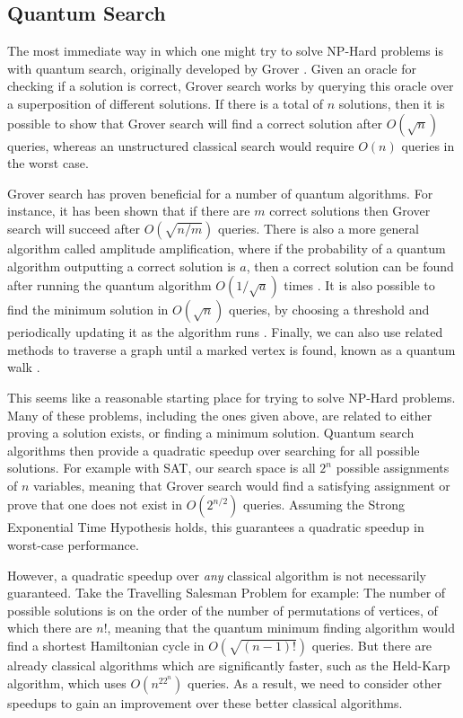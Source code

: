 \subsection{Quantum Search}

The most immediate way in which one might try to solve NP-Hard problems is with quantum search, originally developed by Grover \cite{grover96}. Given an oracle for checking if a solution is correct, Grover search works by querying this oracle over a superposition of different solutions. If there is a total of $n$ solutions, then it is possible to show that Grover search will find a correct solution after $O(\sqrt{n})$ queries, whereas an unstructured classical search would require $O(n)$ queries in the worst case.

Grover search has proven beneficial for a number of quantum algorithms. For instance, it has been shown that if there are $m$ correct solutions then Grover search will succeed after $O(\sqrt{n/m})$ queries. There is also a more general algorithm called amplitude amplification, where if the probability of a quantum algorithm outputting a correct solution is $a$, then a correct solution can be found after running the quantum algorithm $O(1/\sqrt{a})$ times \cite{brassard2002}. It is also possible to find the minimum solution in $O(\sqrt{n})$ queries, by choosing a threshold and periodically updating it as the algorithm runs \cite{durr1996}. Finally, we can also use related methods to traverse a graph until a marked vertex is found, known as a quantum walk \cite{childs2003}.

This seems like a reasonable starting place for trying to solve NP-Hard problems. Many of these problems, including the ones given above, are related to either proving a solution exists, or finding a minimum solution. Quantum search algorithms then provide a quadratic speedup over searching for all possible solutions. For example with SAT, our search space is all $2^n$ possible assignments of $n$ variables, meaning that Grover search would find a satisfying assignment or prove that one does not exist in $O(2^{n/2})$ queries. Assuming the Strong Exponential Time Hypothesis holds, this guarantees a quadratic speedup in worst-case performance.

However, a quadratic speedup over \textit{any} classical algorithm is not necessarily guaranteed. Take the Travelling Salesman Problem for example: The number of possible solutions is on the order of the number of permutations of vertices, of which there are $n!$, meaning that the quantum minimum finding algorithm would find a shortest Hamiltonian cycle in $O(\sqrt{(n-1)!})$ queries. But there are already classical algorithms which are significantly faster, such as the Held-Karp algorithm, which uses $O(n^22^n)$ queries. As a result, we need to consider other speedups to gain an improvement over these better classical algorithms.

